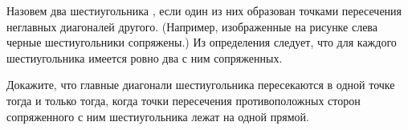 \documentclass[a4paper,11pt]{article}
\begin{document}
\vspace*{-2.2cm}
\vspace*{17mm}


{
 Назовем два шестиугольника
, если один из
них образован
точками пересечения неглавных диагоналей
другого. (Например, изображенные на рисунке
слева черные шестиугольники сопряжены.)
Из определения следует, что для каждого шестиугольника имеется
ровно два с ним сопряженных.
}

\vspace*{-2cm}
\vspace*{17mm}

 Докажите, что  главные диагонали шестиугольника
пересекаются в одной точке тогда и только тогда, когда
точки пересечения противоположных сторон сопряженного
с ним шестиугольника лежат на одной прямой.

\end{document}
